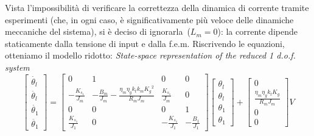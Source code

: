 Vista l'impossibilità di verificare la correttezza della dinamica di corrente tramite esperimenti (che, in ogni caso, è significativamente più veloce delle dinamiche meccaniche del sistema), si è deciso di ignorarla~($L_m = 0$): la corrente dipende staticamente dalla tensione di input e dalla f.e.m. Riscrivendo le equazioni, otteniamo il modello ridotto:
\textit{State-space representation of the reduced 1 d.o.f. system}
\begin{equation}
	\begin{bmatrix}
		\dot{\theta_l} \\
		\ddot{\theta_l} \\
		\dot{\theta_1} \\
		\ddot{\theta_1}
	\end{bmatrix}
	=
	\begin{bmatrix}
		0 &1 & 0 & 0 \\
		-\frac{K_{s_1}}{J_m} & -\frac{B_m}{J_m}-\frac{\eta_m \eta_g k_t k_m {K_g}^2}{R_m J_m}  & \frac{K_{s_1}}{J_m} & 0 \\
		0 & 0 & 0 & 1 \\
		\frac{K_{s_1}}{J_1} & 0 & -\frac{K_{s_1}}{J_1} & -\frac{B_1}{J_1}
	\end{bmatrix}
	\begin{bmatrix}
		\theta_l \\
		\theta_l \\
		\theta_1 \\
		\theta_1
	\end{bmatrix}
	+
	\begin{bmatrix}
		0 \\
		\frac{\eta_m \eta_g k_t K_g}{R_m J_m} \\
		0 \\
		0
	\end{bmatrix}
	V
\end{equation}

